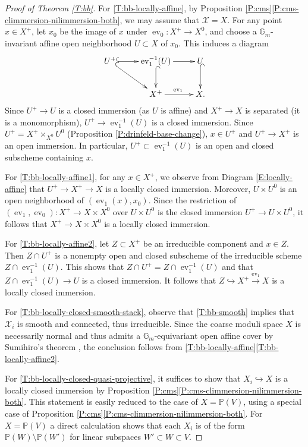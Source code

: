\documentclass[a4paper]{amsart}
\theoremstyle{plain}
\theoremstyle{definition}
\theoremstyle{remark}
\numberwithin{equation}{section}
\newcommand{\GG}{\mathbb{G}}
\newcommand{\PP}{\mathbb{P}}
\newcommand\cX{\mathcal{X}}
\newcommand\co{\colon}
\DeclareMathOperator{\ev}{ev}
\begin{document}
\begin{proof}[Proof of Theorem \ref{T:bb}]
For \eqref{T:bb-locally-affine}, by Proposition \ref{P:cms}\eqref{P:cms-climmersion-nilimmersion-both}, we may assume that $\cX=X$.  For any point $x \in X^+$, let $x_0$ be the image of $x$ under $\ev_0 \co X^+ \to X^0$, and choose a $\GG_m$-invariant affine open neighborhood $U \subset X$ of $x_0$. 
This induces a diagram
\begin{equation} \begin{split} \label{E:locally-affine}
\xymatrix{
U^+ \ar@{^(->}[r] \ar@{^(->}[rd]		& \ev_1^{-1}(U) \ar[r] \ar@{^(->}[d]		& U \ar@{^(->}[d] \\
				& X^+ \ar[r]^{\ev_1}				& X .
}
\end{split} \end{equation}
Since $U^+ \to U$ is a closed immersion (as $U$ is affine) and $X^+ \to X$ is separated (it is a monomorphism), $U^+ \to \ev_1^{-1}(U)$ is a closed immersion.  Since $U^+ = X^+ \times_{X^0} U^0$ (Proposition \ref{P:drinfeld-base-change}), $x \in U^+$ and $U^+ \to X^+$ is an open immersion.  In particular, $U^+ \subset \ev_1^{-1}(U)$ is an open and closed subscheme containing $x$. 

For \eqref{T:bb-locally-affine1}, for any $x \in X^+$, we observe from Diagram \eqref{E:locally-affine} that $U^+ \to X^+ \to X$ is a locally closed immersion.  Moreover, $U \times U^0$ is an open neighborhood of $(\ev_1(x),x_0)$.  Since the restriction of $(\ev_1, \ev_0) \co X^+ \to X \times X^0$ over $U \times U^0$ is the closed immersion $U^+ \to U \times U^0$, it follows that $X^+ \to X \times X^0$ is a locally closed immersion.

For \eqref{T:bb-locally-affine2}, let $Z \subset X^+$ be an irreducible component and $x \in Z$.  Then $Z \cap U^+$ is a nonempty open and closed subscheme of the irreducible scheme  $Z \cap \ev_1^{-1}(U)$.  This shows that $Z \cap U^+ = Z \cap \ev_1^{-1}(U)$ and that $Z \cap \ev_1^{-1}(U) \to U$ is a closed immersion.  It follows that $Z \hookrightarrow X^+ \xrightarrow{\ev_1} X$ is a locally closed immersion.

For \eqref{T:bb-locally-closed-smooth-stack}, observe that \eqref{T:bb-smooth} implies that $\cX_i$ is smooth and connected,  thus irreducible.  Since the coarse moduli space $X$ is necessarily normal and thus admits a $\GG_m$-equivariant open affine cover by Sumihiro's theorem \cite[Cor.~2]{sumihiro}, the conclusion follows from \eqref{T:bb-locally-affine}\eqref{T:bb-locally-affine2}.

For \eqref{T:bb-locally-closed-quasi-projective}, it suffices to show that $X_i \hookrightarrow X$ is a locally closed immersion by Proposition \ref{P:cms}\eqref{P:cms-climmersion-nilimmersion-both}.  This statement is easily reduced to the case of $X=\PP(V)$, using a special case of Proposition \ref{P:cms}\eqref{P:cms-climmersion-nilimmersion-both}. For $X=\PP(V)$ a direct calculation shows that each $X_i$ is of the form $\PP(W) \setminus \PP(W')$ for linear subspaces $W' \subset W \subset V$.
\end{proof}
\end{document}
